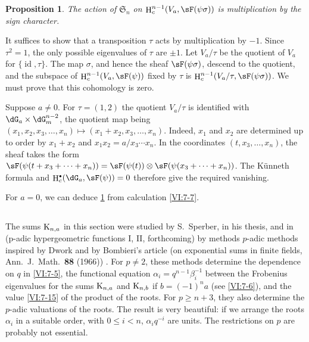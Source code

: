 \documentclass[oneside]{book}
\DeclareMathOperator{\h}{H}
\newcounter{char}
\newcommand{\kloos}{\textnormal{K}} %
\theoremstyle{sga-source}
\theoremstyle{sga-source-dash}
\theoremstyle{sga-source-dotdash}
\theoremstyle{sga-source-number-note-dash}
\theoremstyle{sga-source-note-number-dotdash}
\theoremstyle{sga-source-example-dotdash}
\theoremstyle{sga-source-inline-number}
\theoremstyle{sga-source-bare-number}
\theoremstyle{sga-source}
\newtheorem{proposition_}[subsection]{Proposition}
\let\oldbullet\bullet
\renewcommand{\bullet}{\textnormal{\tiny$\oldbullet$}}
\newcommand{\PrintPage}[1]{}\newcommand{\MathPage}[1]{}\newcommand{\PrintCite}[2]{#1}\newcommand{\var}[3]{#2}
\begin{document}
\begin{proposition_}\label{VI:7-20}
The action of $\mathfrak{S}_n$ on $\h_c^{n-1}(V_a,\sF(\psi\sigma))$ is multiplication 
by the sign character. 
\end{proposition_}

It suffices to show that a transposition $\tau$ acts by multiplication 
by $-1$. Since $\tau^2=1$, the only possible eigenvalues of $\tau$ are 
$\pm 1$. Let $V_a/\tau$ be the quotient of $V_a$ for 
$\{\operatorname{id},\tau\}$. The map $\sigma$, and hence the sheaf 
$\sF(\psi\sigma)$, descend to the quotient, and the subspace of 
  $\h_c^{n-1}(V_a,\sF(\psi))$ fixed by 
$\tau$ is $\h_c^{n-1}(V_a/\tau,\sF(\psi\sigma))$. We must prove that 
this cohomology is zero. 

Suppose $a\ne 0$. For $\tau=(1,2)$ the quotient $V_a/\tau$ is identified 
with $\dG_a\times \dG_m^{n-2}$, the quotient map being 
$(x_1,x_2,x_3,\dots,x_n)\mapsto (x_1+x_2,x_3,\dots,x_n)$. Indeed, $x_1$ and 
$x_2$ are determined \PrintPage{229}
up to order by $x_1+x_2$ and 
$x_1x_2 = a/x_3\dotsm x_n$. In the coordinates $(t,x_3,\dots,x_n)$, the 
sheaf takes the form 
$\sF(\psi(t+x_3+\cdots + x_n)) = \sF(\psi(t))\otimes \sF(\psi(x_3+\cdots + x_n))$. 
  The K\"unneth formula and $\var{\h_0^\bullet(\dG_a,\sF(\psi))}{\h_c^\bullet(\dG_a,\sF(\psi))}{S45-SOL-0973} = 0$ therefore give 
the required vanishing. 

For $a=0$, we can deduce \ref{VI:7-20} from calculation \ref{VI:7-7}. 





\subsection{}\label{VI:7-21}

The sums $\kloos_{n,a}$ in this section were studied by 
S.\ Sperber, in his thesis, and in (p-adic hypergeometric functions I, II, forthcoming) \cite{sp77} by methods 
$p$-adic methods inspired by Dwork and by Bombieri's article (on exponential sums in finite fields, Ann.~J.~Math.~\textbf{88} (1966)) \cite{bo66}. 
For $p\ne 2$, these methods determine the dependence on $q$ in \ref{VI:7-5}, 
the functional equation $\alpha_i = q^{n-1} \beta_i^{-1}$ between the 
Frobenius eigenvalues for the sums $\kloos_{n,a}$ and 
$\kloos_{n,b}$ if $b=(-1)^n a$ (see \ref{VI:7-6}), and the value \ref{VI:7-15} 
of the product of the roots. For $p\geqslant n+3$, they also determine the 
$p$-adic valuations of the roots. The result is very beautiful: if we arrange 
the roots $\alpha_i$ in a suitable order, with 
  $0\leqslant i<n$, $\alpha_i q^{-i}$ are units. The 
restrictions on $p$ are probably not essential. 
\end{document}
